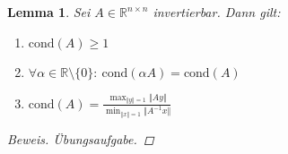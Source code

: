 \documentclass[12pt]{article}
\theoremstyle{break}
\newtheorem{lemma}[theorem]{Lemma}
\newtheorem{comment}[theorem]{Bemerkung}
\begin{document}
\begin{comment}
    \begin{align*}
    &\tilde{x}_1-x_1 = x_1(-\varepsilon_1 + \varepsilon_3) - x_2(-\varepsilon_3 + \varepsilon_5 - \varepsilon_4 + \varepsilon_2) + \mathcal{O}(eps^2)&\\
    &\frac{\vert \tilde{x}_1 - x_1 \vert}{\vert x_1 \vert} \leq ( 2 + 4 \frac{\vert x_2 \vert}{\vert x_1 \vert} ) eps
    \end{align*}
    Dieser Wert kann sehr groß werden für $\frac{\vert x_2 \vert}{\vert x_1 \vert} \rightarrow \infty$, aber $\frac{\vert \tilde{x}_1 - x_1 \vert}{\Vert x_1 \Vert_{\infty}} \leq 6eps$.
\end{description} 
\end{comment}

\begin{lemma}
Sei $A \in \mathbb{R}^{n \times n}$ invertierbar. Dann gilt:
\renewcommand{\labelenumi}{\roman{enumi})}
\begin{enumerate}
  \item $\text{cond}(A) \geq 1$
  \item $\forall \alpha \in \mathbb{R}\setminus \{0\}: \medspace \text{cond}(\alpha A) = \text{cond}(A)$
  \item $ \text{cond}(A) = \frac{\max_{\Vert y \Vert = 1} \Vert Ay \Vert}{\min_{\Vert x \Vert = 1} \Vert A^{-1}x \Vert}$
\end{enumerate}
\begin{proof}[Beweis]
Übungsaufgabe.
\end{proof}
\end{lemma}
\end{document}
